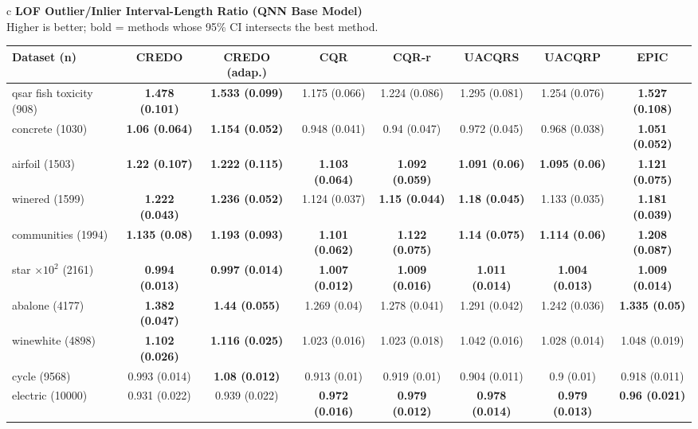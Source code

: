 \documentclass[border=6pt]{standalone}
\begin{document}
\begin{adjustbox}{max width=\linewidth}
\begin{tabular}{c}
{\small\textbf{LOF Outlier/Inlier Interval-Length Ratio (QNN Base Model)}}\\[-1pt]
{\scriptsize Higher is better; bold = methods whose 95\% CI intersects the best method.}\\[2pt]
\scriptsize\begin{tabular}{lccccccc}
\hline
Dataset (n) & \textbf{CREDO} & \textbf{CREDO (adap.)} & \textbf{CQR} & \textbf{CQR-r} & \textbf{UACQRS} & \textbf{UACQRP} & \textbf{EPIC}\\ \hline
qsar fish toxicity (908) & \textbf{1.478 (0.101)} & \textbf{1.533 (0.099)} & 1.175 (0.066) & 1.224 (0.086) & 1.295 (0.081) & 1.254 (0.076) & \textbf{1.527 (0.108)}\\
concrete (1030) & \textbf{1.06 (0.064)} & \textbf{1.154 (0.052)} & 0.948 (0.041) & 0.94 (0.047) & 0.972 (0.045) & 0.968 (0.038) & \textbf{1.051 (0.052)}\\
airfoil (1503) & \textbf{1.22 (0.107)} & \textbf{1.222 (0.115)} & \textbf{1.103 (0.064)} & \textbf{1.092 (0.059)} & \textbf{1.091 (0.06)} & \textbf{1.095 (0.06)} & \textbf{1.121 (0.075)}\\
winered (1599) & \textbf{1.222 (0.043)} & \textbf{1.236 (0.052)} & 1.124 (0.037) & \textbf{1.15 (0.044)} & \textbf{1.18 (0.045)} & 1.133 (0.035) & \textbf{1.181 (0.039)}\\
communities (1994) & \textbf{1.135 (0.08)} & \textbf{1.193 (0.093)} & \textbf{1.101 (0.062)} & \textbf{1.122 (0.075)} & \textbf{1.14 (0.075)} & \textbf{1.114 (0.06)} & \textbf{1.208 (0.087)}\\
star $\times 10^2$ (2161) & \textbf{0.994 (0.013)} & \textbf{0.997 (0.014)} & \textbf{1.007 (0.012)} & \textbf{1.009 (0.016)} & \textbf{1.011 (0.014)} & \textbf{1.004 (0.013)} & \textbf{1.009 (0.014)}\\
abalone (4177) & \textbf{1.382 (0.047)} & \textbf{1.44 (0.055)} & 1.269 (0.04) & 1.278 (0.041) & 1.291 (0.042) & 1.242 (0.036) & \textbf{1.335 (0.05)}\\
winewhite (4898) & \textbf{1.102 (0.026)} & \textbf{1.116 (0.025)} & 1.023 (0.016) & 1.023 (0.018) & 1.042 (0.016) & 1.028 (0.014) & 1.048 (0.019)\\
cycle (9568) & 0.993 (0.014) & \textbf{1.08 (0.012)} & 0.913 (0.01) & 0.919 (0.01) & 0.904 (0.011) & 0.9 (0.01) & 0.918 (0.011)\\
electric (10000) & 0.931 (0.022) & 0.939 (0.022) & \textbf{0.972 (0.016)} & \textbf{0.979 (0.012)} & \textbf{0.978 (0.014)} & \textbf{0.979 (0.013)} & \textbf{0.96 (0.021)}\\

\end{tabular}
\end{tabular}
\end{adjustbox}
\end{document}
